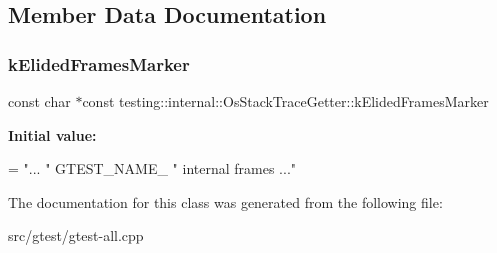 \subsection{Member Data Documentation}
\mbox{\label{classtesting_1_1internal_1_1_os_stack_trace_getter_aa736c26a4ba2b59a7572e7f44bfe269e}} 
\subsubsection{\texorpdfstring{k\+Elided\+Frames\+Marker}{kElidedFramesMarker}}
{\footnotesize\ttfamily const char $\ast$const testing\+::internal\+::\+Os\+Stack\+Trace\+Getter\+::k\+Elided\+Frames\+Marker\hspace{0.3cm}{\ttfamily [static]}}

{\bfseries Initial value\+:}
\begin{DoxyCode}
=
    \textcolor{stringliteral}{"... "} GTEST\_NAME\_ \textcolor{stringliteral}{" internal frames ..."}
\end{DoxyCode}


The documentation for this class was generated from the following file\+:\begin{DoxyCompactItemize}
\item 
src/gtest/gtest-\/all.\+cpp\end{DoxyCompactItemize}
